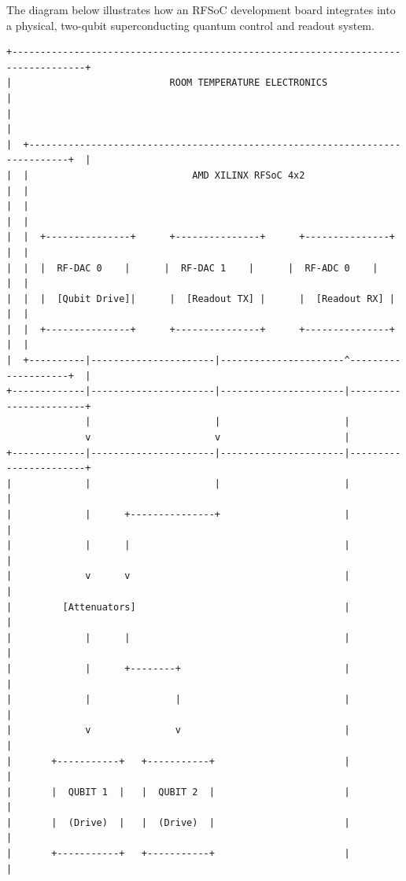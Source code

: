 \documentclass[
]{article}
\begin{document}
The diagram below illustrates how an RFSoC development board integrates
into a physical, two-qubit superconducting quantum control and readout
system.

\begin{verbatim}
+-----------------------------------------------------------------------------------+
|                            ROOM TEMPERATURE ELECTRONICS                           |
|                                                                                   |
|  +-----------------------------------------------------------------------------+  |
|  |                             AMD XILINX RFSoC 4x2                            |  |
|  |                                                                             |  |
|  |  +---------------+      +---------------+      +---------------+            |  |
|  |  |  RF-DAC 0    |      |  RF-DAC 1    |      |  RF-ADC 0    |            |  |
|  |  |  [Qubit Drive]|      |  [Readout TX] |      |  [Readout RX] |            |  |
|  |  +---------------+      +---------------+      +---------------+            |  |
|  +----------|----------------------|----------------------^--------------------+  |
+-------------|----------------------|----------------------|-----------------------+
              |                      |                      |
              v                      v                      |
+-------------|----------------------|----------------------|-----------------------+
|             |                      |                      |                       |
|             |      +---------------+                      |                       |
|             |      |                                      |                       |
|             v      v                                      |                       |
|         [Attenuators]                                     |                       |
|             |      |                                      |                       |
|             |      +--------+                             |                       |
|             |               |                             |                       |
|             v               v                             |                       |
|       +-----------+   +-----------+                       |                       |
|       |  QUBIT 1  |   |  QUBIT 2  |                       |                       |
|       |  (Drive)  |   |  (Drive)  |                       |                       |
|       +-----------+   +-----------+                       |                       |

\end{verbatim}
\end{document}
